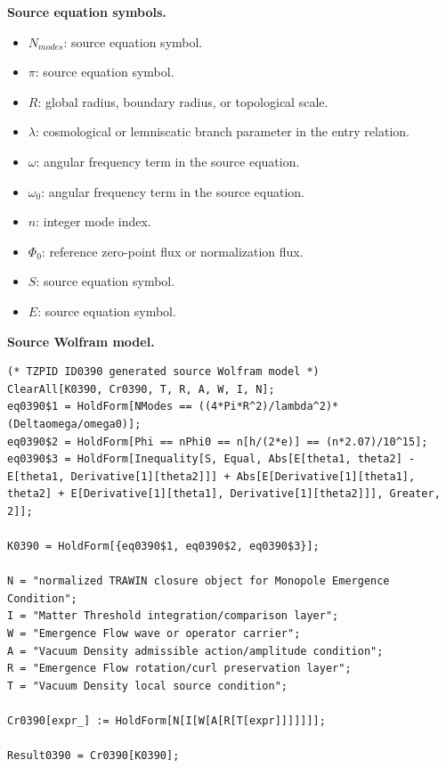\begin{minipage}[t]{0.49\linewidth}
\begingroup
\small
\raggedright
\textbf{Source equation symbols.}\par
\begin{itemize}[leftmargin=1.35em,itemsep=1pt,topsep=1pt,parsep=0pt]
    \item $N_{modes}$: source equation symbol.
    \item $\pi$: source equation symbol.
    \item $R$: global radius, boundary radius, or topological scale.
    \item $\lambda$: cosmological or lemniscatic branch parameter in the entry relation.
    \item $\omega$: angular frequency term in the source equation.
    \item $\omega_0$: angular frequency term in the source equation.
    \item $n$: integer mode index.
    \item $\Phi_0$: reference zero-point flux or normalization flux.
    \item $S$: source equation symbol.
    \item $E$: source equation symbol.
\end{itemize}
\endgroup
\end{minipage}\hfill
\begin{minipage}[t]{0.47\linewidth}
\begingroup
\scriptsize
\raggedright
\textbf{Source Wolfram model.}\par
\begin{Verbatim}[fontsize=\tiny,breaklines=true,breakanywhere=true]
(* TZPID ID0390 generated source Wolfram model *)
ClearAll[K0390, Cr0390, T, R, A, W, I, N];
eq0390$1 = HoldForm[NModes == ((4*Pi*R^2)/lambda^2)*(Deltaomega/omega0)];
eq0390$2 = HoldForm[Phi == nPhi0 == n[h/(2*e)] == (n*2.07)/10^15];
eq0390$3 = HoldForm[Inequality[S, Equal, Abs[E[theta1, theta2] - E[theta1, Derivative[1][theta2]]] + Abs[E[Derivative[1][theta1], theta2] + E[Derivative[1][theta1], Derivative[1][theta2]]], Greater, 2]];

K0390 = HoldForm[{eq0390$1, eq0390$2, eq0390$3}];

N = "normalized TRAWIN closure object for Monopole Emergence Condition";
I = "Matter Threshold integration/comparison layer";
W = "Emergence Flow wave or operator carrier";
A = "Vacuum Density admissible action/amplitude condition";
R = "Emergence Flow rotation/curl preservation layer";
T = "Vacuum Density local source condition";

Cr0390[expr_] := HoldForm[N[I[W[A[R[T[expr]]]]]]];

Result0390 = Cr0390[K0390];
\end{Verbatim}
\endgroup
\end{minipage}

